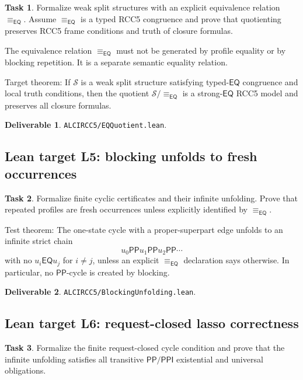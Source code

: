 \documentclass[11pt]{article}
\newcommand{\EQ}{\mathsf{EQ}}
\newcommand{\PP}{\mathsf{PP}}
\newcommand{\PPI}{\mathsf{PPI}}
\newcommand{\eqrel}{\equiv_{\EQ}}
\theoremstyle{definition}
\newtheorem{task}{Task}
\newtheorem{deliverable}{Deliverable}
\theoremstyle{plain}
\begin{document}
\begin{task}
Formalize weak split structures with an explicit equivalence relation \(\eqrel\).  Assume \(\eqrel\) is a typed RCC5 congruence and prove that quotienting preserves RCC5 frame conditions and truth of closure formulas.
\end{task}

The equivalence relation \(\eqrel\) must not be generated by profile equality or by blocking repetition.  It is a separate semantic equality relation.

Target theorem:
If \(\mathcal S\) is a weak split structure satisfying typed-\(\EQ\) congruence and local truth conditions, then the quotient \(\mathcal S/{\eqrel}\) is a strong-\(\EQ\) RCC5 model and preserves all closure formulas.

\begin{deliverable}
\texttt{ALCIRCC5/EQQuotient.lean}.
\end{deliverable}

\subsection{Lean target L5: blocking unfolds to fresh occurrences}

\begin{task}
Formalize finite cyclic certificates and their infinite unfolding.  Prove that repeated profiles are fresh occurrences unless explicitly identified by \(\eqrel\).
\end{task}

Test theorem:
The one-state cycle with a proper-superpart edge unfolds to an infinite strict chain
\[
 u_0\PP u_1\PP u_2\PP\cdots
\]
with no \(u_i\EQ u_j\) for \(i\ne j\), unless an explicit \(\eqrel\) declaration says otherwise.  In particular, no \(\PP\)-cycle is created by blocking.

\begin{deliverable}
\texttt{ALCIRCC5/BlockingUnfolding.lean}.
\end{deliverable}

\subsection{Lean target L6: request-closed lasso correctness}

\begin{task}
Formalize the finite request-closed cycle condition and prove that the infinite unfolding satisfies all transitive \(\PP/\PPI\) existential and universal obligations.
\end{task}
\end{document}
